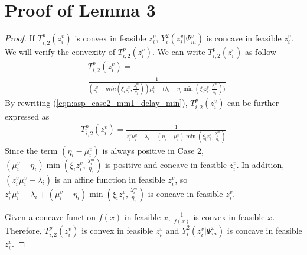 \documentclass[10pt,journal, compsoc]{IEEEtran}
\begin{document}
  \section{Proof of Lemma 3}\label{appendix:lemma_3}
    \begin{proof}
    If $T_{i,2}^p(z_i^v)$ is convex in feasible $z_i^v$, $Y_i^2(z_i^v|\Psi_m^v)$ is concave in feasible $z_i^v$. We will verify the convexity of $T_{i,2}^p(z_i^v)$. We can write $T_{i,2}^p(z_i^v)$ as follow
    \begin{equation} \label{eqn:asp_case2_mm1_delay_min}
    \begin{aligned}
    &T_{i,2}^p(z_i^v) = \\ &\frac{1}{(z_i^v-min(\xi_i z_i^v, \frac{\lambda_i^m}{\eta_i}))\mu_i^v - \big(\lambda_i - \eta_i\min(\xi_i z_i^v, \frac{\lambda_i^m}{\eta_i})\big)}
    \end{aligned}
    \end{equation}
    By rewriting (\ref{eqn:asp_case2_mm1_delay_min}), $T_{i,2}^p(z_i^v)$ can be further expressed as
    \begin{equation} \label{eqn:asp_case2_mm1_delay_min_new}
    \begin{aligned}
    T_{i,2}^p(z_i^v) = \frac{1}{z_i^v\mu_i^v - \lambda_i +(\eta_i - \mu_i^v)\min(\xi_i z_i^v, \frac{\lambda_i^m}{\eta_i})}
    \end{aligned}
    \end{equation}
    Since the term $(\eta_i - \mu_i^v)$ is always positive in Case 2, $(\mu_i^v - \eta_i)\min(\xi_i z_i^v, \frac{\lambda_i^m}{\eta_i})$ is positive and concave in feasible $z_i^v$. In addition, $(z_i^v\mu_i^v - \lambda_i)$ is an affine function in feasible $z_i^v$, so $z_i^v\mu_i^v - \lambda_i+(\mu_i^v - \eta_i)\min(\xi_i z_i^v, \frac{\lambda_i^m}{\eta_i})$ is concave in feasible $z_i^v$.
    
    Given a concave function $f(x)$ in feasible $x$, $\frac{1}{f(x)}$ is convex in feasible $x$. Therefore, $T_{i,2}^p(z_i^v)$ is convex in feasible $z_i^v$ and $Y_i^2(z_i^v|\Psi_m^v)$ is concave in feasible $z_i^v$.  \qedhere
    \end{proof}
\end{document}
